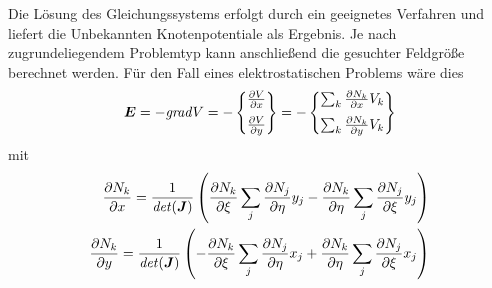 Die Lösung des Gleichungssystems erfolgt durch ein geeignetes Verfahren und liefert die Unbekannten Knotenpotentiale als Ergebnis. Je nach zugrundeliegendem Problemtyp kann anschließend die gesuchter Feldgröße berechnet werden. Für den Fall eines elektrostatischen Problems wäre dies
\begin{equation}
\vec{E} = -\mathit{grad}V = 
-\begin{Bmatrix}
\parDiff{V}{x} \\[2mm]
\parDiff{V}{y}
\end{Bmatrix} = 
%
-\begin{Bmatrix}
\sum_{k} \parDiff{N_k}{x} V_k\\[2mm]
\sum_{k} \parDiff{N_k}{y} V_k
\end{Bmatrix}
\end{equation}
mit 
\begin{align*}
\frac{\partial N_k}{\partial x} = \frac{1}{\mathit{det}(\boldsymbol{J})} \left( \frac{\partial N_k}{\partial \xi} \sum_{j} \frac{\partial N_j}{\partial \eta} y_j - \frac{\partial N_k}{\partial \eta} \sum_{j} \frac{\partial N_j}{\partial \xi} y_j \right) \\
\frac{\partial N_k}{\partial y} = \frac{1}{\mathit{det}(\boldsymbol{J})} \left( -\frac{\partial N_k}{\partial \xi} \sum_{j} \frac{\partial N_j}{\partial \eta} x_j + \frac{\partial N_k}{\partial \eta} \sum_{j} \frac{\partial N_j}{\partial \xi} x_j \right) \\
\end{align*}

